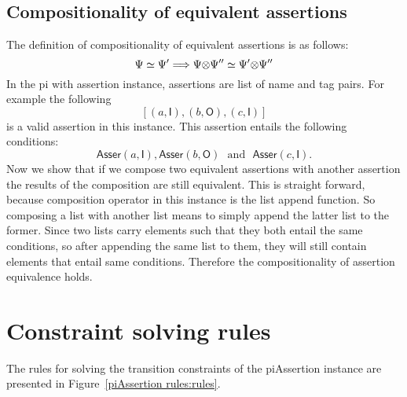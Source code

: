 \documentclass[11pt,a4paper]{article}
\theoremstyle{definition}
\begin{document}
\subsection{Compositionality of equivalent assertions}
The definition of compositionality of equivalent assertions is as follows:
\[
\Psi \simeq \Psi' \Longrightarrow \Psi {\otimes} \Psi'' \simeq \Psi' {\otimes} \Psi''
\]
In the pi with assertion instance, assertions are list of name and tag pairs.
For example the following
\[
[(a,\mathsf{I}),(b,\mathsf{O}),(c,\mathsf{I})]
\]
is a valid assertion in this instance. This assertion entails the following conditions:
\[
\mathsf{Asser}(a,\mathsf{I}), \mathsf{Asser}(b,\mathsf{O}) \text{~~and~~} \mathsf{Asser}(c,\mathsf{I}).
\]
Now we show that if we compose two equivalent assertions with another
assertion the results of the composition are still equivalent.
This is straight forward, because composition operator in this instance is
the list append function. So composing a list with another list means to
simply append the latter list to the former. Since two lists carry
elements such that they both entail the same conditions, so after appending the same
list to them, they will still contain elements that entail same conditions.
Therefore the compositionality of assertion equivalence holds.
 
\section{Constraint solving rules}
The rules for solving the transition constraints of the piAssertion instance
are presented in Figure~\ref{piAssertion rules:rules}.
\end{document}
